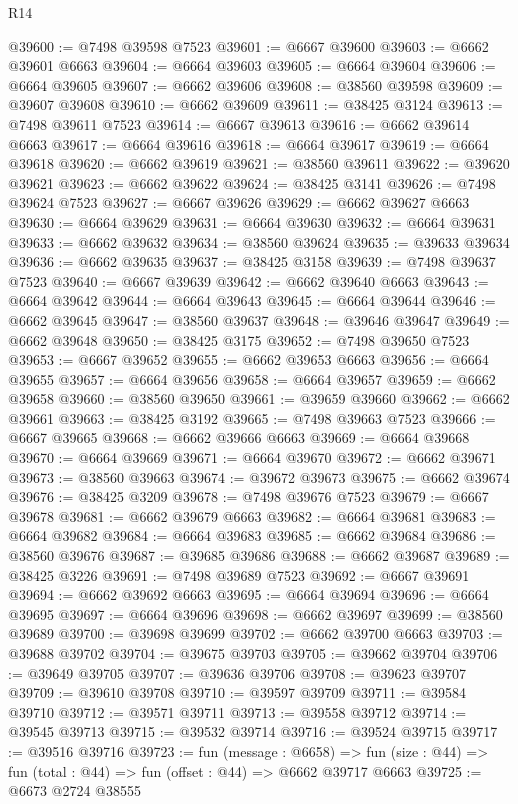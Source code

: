 \begin{lexlean}{R14}
\begin{coremodule}
@39600 := @7498 @39598 @7523
@39601 := @6667 @39600
@39603 := @6662 @39601 @6663
@39604 := @6664 @39603
@39605 := @6664 @39604
@39606 := @6664 @39605
@39607 := @6662 @39606
@39608 := @38560 @39598
@39609 := @39607 @39608
@39610 := @6662 @39609
@39611 := @38425 @3124
@39613 := @7498 @39611 @7523
@39614 := @6667 @39613
@39616 := @6662 @39614 @6663
@39617 := @6664 @39616
@39618 := @6664 @39617
@39619 := @6664 @39618
@39620 := @6662 @39619
@39621 := @38560 @39611
@39622 := @39620 @39621
@39623 := @6662 @39622
@39624 := @38425 @3141
@39626 := @7498 @39624 @7523
@39627 := @6667 @39626
@39629 := @6662 @39627 @6663
@39630 := @6664 @39629
@39631 := @6664 @39630
@39632 := @6664 @39631
@39633 := @6662 @39632
@39634 := @38560 @39624
@39635 := @39633 @39634
@39636 := @6662 @39635
@39637 := @38425 @3158
@39639 := @7498 @39637 @7523
@39640 := @6667 @39639
@39642 := @6662 @39640 @6663
@39643 := @6664 @39642
@39644 := @6664 @39643
@39645 := @6664 @39644
@39646 := @6662 @39645
@39647 := @38560 @39637
@39648 := @39646 @39647
@39649 := @6662 @39648
@39650 := @38425 @3175
@39652 := @7498 @39650 @7523
@39653 := @6667 @39652
@39655 := @6662 @39653 @6663
@39656 := @6664 @39655
@39657 := @6664 @39656
@39658 := @6664 @39657
@39659 := @6662 @39658
@39660 := @38560 @39650
@39661 := @39659 @39660
@39662 := @6662 @39661
@39663 := @38425 @3192
@39665 := @7498 @39663 @7523
@39666 := @6667 @39665
@39668 := @6662 @39666 @6663
@39669 := @6664 @39668
@39670 := @6664 @39669
@39671 := @6664 @39670
@39672 := @6662 @39671
@39673 := @38560 @39663
@39674 := @39672 @39673
@39675 := @6662 @39674
@39676 := @38425 @3209
@39678 := @7498 @39676 @7523
@39679 := @6667 @39678
@39681 := @6662 @39679 @6663
@39682 := @6664 @39681
@39683 := @6664 @39682
@39684 := @6664 @39683
@39685 := @6662 @39684
@39686 := @38560 @39676
@39687 := @39685 @39686
@39688 := @6662 @39687
@39689 := @38425 @3226
@39691 := @7498 @39689 @7523
@39692 := @6667 @39691
@39694 := @6662 @39692 @6663
@39695 := @6664 @39694
@39696 := @6664 @39695
@39697 := @6664 @39696
@39698 := @6662 @39697
@39699 := @38560 @39689
@39700 := @39698 @39699
@39702 := @6662 @39700 @6663
@39703 := @39688 @39702
@39704 := @39675 @39703
@39705 := @39662 @39704
@39706 := @39649 @39705
@39707 := @39636 @39706
@39708 := @39623 @39707
@39709 := @39610 @39708
@39710 := @39597 @39709
@39711 := @39584 @39710
@39712 := @39571 @39711
@39713 := @39558 @39712
@39714 := @39545 @39713
@39715 := @39532 @39714
@39716 := @39524 @39715
@39717 := @39516 @39716
@39723 := fun (message : @6658) =>
  fun (size : @44) => fun (total : @44) => fun (offset : @44) => @6662 @39717 @6663
@39725 := @6673 @2724 @38555

\end{coremodule}
\end{lexlean}
